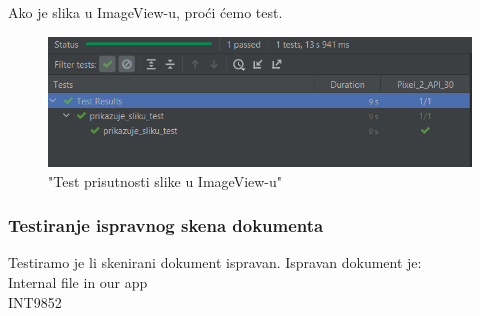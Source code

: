 	Ako je slika u ImageView-u, proći ćemo test.
	
	\begin{figure}[H]
		\centering
		\includegraphics[scale=0.5]{./slike/test2.png}
		\caption{"Test prisutnosti slike u ImageView-u"}
		\label{fig:test2}
	\end{figure}\eject


	\subsubsection{Testiranje ispravnog skena dokumenta}
Testiramo je li skenirani dokument ispravan.
Ispravan dokument je:\\
Internal file in our app\\
INT9852

